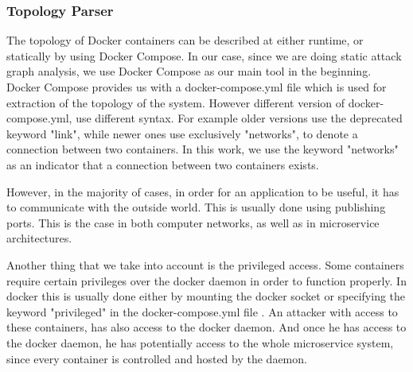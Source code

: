 \documentclass[letterpaper, 10 pt, conference]{ieeeconf}  %
\begin{document}
\subsubsection{Topology Parser}
The topology of Docker containers can be described at either runtime, or statically by using Docker Compose. In our case, since we are doing static attack graph analysis, we use Docker Compose as our main tool in the beginning. Docker Compose provides us with a docker-compose.yml file which is used for extraction of the topology of the system. However different version of docker-compose.yml, use different syntax. For example older versions use the deprecated keyword "link", while newer ones use exclusively "networks", to denote a connection between two containers. In this work, we use the keyword "networks" as an indicator that a connection between two containers exists.

However, in the majority of cases, in order for an application to be useful, it has to communicate with the outside world. This is usually done using publishing ports. This is the case in both computer networks, as well as in microservice architectures.

Another thing that we take into account is the privileged access. Some containers require certain privileges over the docker daemon in order to function properly. In docker this is usually done either by mounting the docker socket or specifying the keyword "privileged" in the docker-compose.yml file . An attacker with access to these containers, has also access to the docker daemon. And once he has access to the docker daemon, he has potentially access to the whole microservice system, since every container is controlled and hosted by the daemon.
\end{document}
